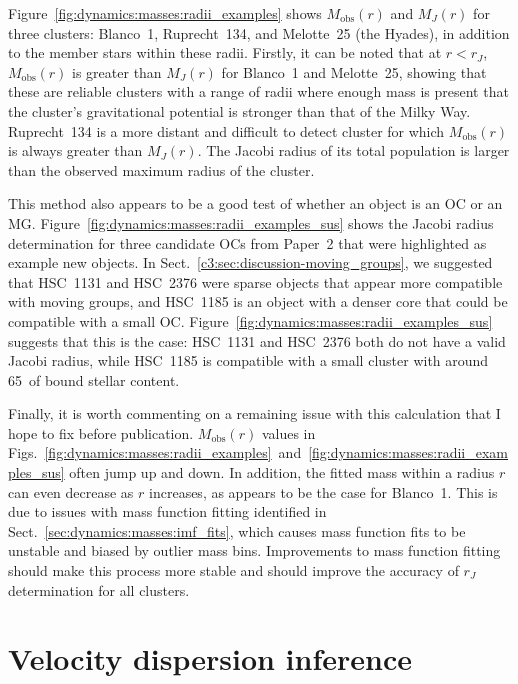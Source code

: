 Figure~\ref{fig:dynamics:masses:radii_examples} shows $M_\text{obs}(r)$ and $M_J(r)$ for three clusters: Blanco~1, Ruprecht~134, and Melotte~25 (the Hyades), in addition to the member stars within these radii. Firstly, it can be noted that at $r<r_J$, $M_\text{obs}(r)$ is greater than $M_J(r)$ for Blanco~1 and Melotte~25, showing that these are reliable clusters with a range of radii where enough mass is present that the cluster's gravitational potential is stronger than that of the Milky Way. Ruprecht~134 is a more distant and difficult to detect cluster for which $M_\text{obs}(r)$ is always greater than $M_J(r)$. The Jacobi radius of its total population is larger than the observed maximum radius of the cluster.

This method also appears to be a good test of whether an object is an OC or an MG. Figure~\ref{fig:dynamics:masses:radii_examples_sus} shows the Jacobi radius determination for three candidate OCs from Paper~2 that were highlighted as example new objects. In Sect.~\ref{c3:sec:discussion-moving_groups}, we suggested that HSC~1131 and HSC~2376 were sparse objects that appear more compatible with moving groups, and HSC~1185 is an object with a denser core that could be compatible with a small OC. Figure~\ref{fig:dynamics:masses:radii_examples_sus} suggests that this is the case: HSC~1131 and HSC~2376 both do not have a valid Jacobi radius, while HSC~1185 is compatible with a small cluster with around 65~\MSun of bound stellar content.

Finally, it is worth commenting on a remaining issue with this calculation that I hope to fix before publication. $M_\text{obs}(r)$ values in Figs.~\ref{fig:dynamics:masses:radii_examples}~and~\ref{fig:dynamics:masses:radii_examples_sus} often jump up and down. In addition, the fitted mass within a radius $r$ can even decrease as $r$ increases, as appears to be the case for Blanco~1. This is due to issues with mass function fitting identified in Sect.~\ref{sec:dynamics:masses:imf_fits}, which causes mass function fits to be unstable and biased by outlier mass bins. Improvements to mass function fitting should make this process more stable and should improve the accuracy of $r_J$ determination for all clusters.



\section{Velocity dispersion inference}
\label{sec:dynamics:velocities}

